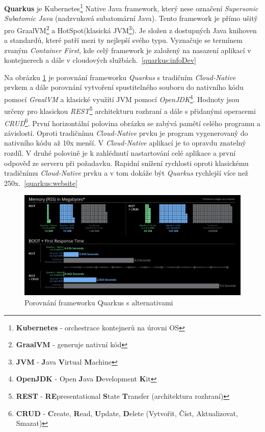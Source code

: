 \textbf{Quarkus} je Kubernetes\footnote{\textbf{Kubernetes} - orchestrace kontejnerů na úrovni OS} Native Java framework, který nese označení \emph{Supersonic Subatomic Java} (nadzvuková subatomární Java). Tento framework je přímo ušitý pro GraalVM\footnote{\textbf{GraalVM} - generuje nativní kód} a HotSpot(klasická JVM\footnote{\textbf{JVM} - \textbf{J}ava \textbf{V}irtual \textbf{M}achine}).
Je složen z dostupných Java knihoven a standardů, které patří mezi ty nejlepší svého typu. Vyznačuje se termínem zvaným \emph{Container First}, kde celý framework je založený na nasazení aplikací v kontejnerech a dále v cloudových službách.~\ref{quarkus:infoDev}

Na obrázku \ref{figure:quarkus_stats} je porovnání frameworku \emph{Quarkus} s tradičním \emph{Cloud-Native} prvkem a dále porovnání vytvoření spustitelného souboru do nativního kódu pomocí \emph{GraalVM} a klasické využítí JVM pomocí \emph{OpenJDK}\footnote{\textbf{OpenJDK} - Open \textbf{J}ava \textbf{D}evelopment \textbf{K}it}.
Hodnoty jsou určeny pro klasickou \emph{REST}\footnote{\textbf{REST} - \textbf{RE}presentational \textbf{S}tate \textbf{T}ransfer (architektura rozhraní)} architekturu rozhraní a dále s přidanými operacemi \emph{CRUD}\footnote{\textbf{CRUD} - \textbf{C}reate, \textbf{R}ead, \textbf{U}pdate, \textbf{D}elete (Vytvořit, Číst, Aktualizovat, Smazat)}.
První horizontální polovina obrázku se zabývá pamětí celého programu a závislostí. Oproti tradičnímu \emph{Cloud-Native} prvku je program vygenerovaný do nativního kódu až 10x menší. V \emph{Cloud-Native} aplikací je to opravdu znatelný rozdíl.
V druhé polovině je k zahlédnutí nastartování celé aplikace a první odpověď ze serveru při požadavku. Rapidní snížení rychlosti oproti klasickému tradičnímu \emph{Cloud-Native} prvku a v tom dokáže být \emph{Quarkus} rychlejší více než 250x.~\ref{quarkus:website}

\begin{figure}[hbt]
  \centering
  \includegraphics[width=1 \linewidth]{obrazky-figures/quarkus_stats.png}
  \caption{Porovnání frameworku Quarkus s alternativami}
  \label{figure:quarkus_stats}
\end{figure}

